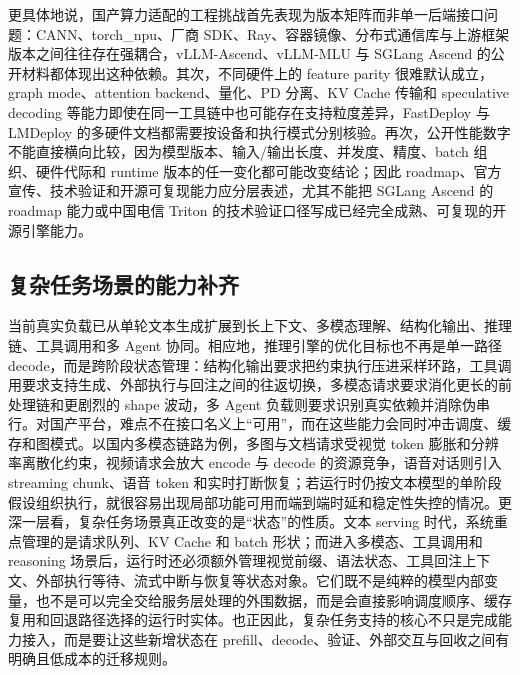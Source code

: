 更具体地说，国产算力适配的工程挑战首先表现为版本矩阵而非单一后端接口问题：CANN、torch\_npu、厂商 SDK、Ray、容器镜像、分布式通信库与上游框架版本之间往往存在强耦合，vLLM-Ascend、vLLM-MLU 与 SGLang Ascend 的公开材料都体现出这种依赖\citep{vllmascend,vllmmlu,sglang_ascend_npu}。其次，不同硬件上的 feature parity 很难默认成立，graph mode、attention backend、量化、PD 分离、KV Cache 传输和 speculative decoding 等能力即使在同一工具链中也可能存在支持粒度差异，FastDeploy 与 LMDeploy 的多硬件文档都需要按设备和执行模式分别核验\citep{fastdeploy_docs,lmdeploy_supported_models}。再次，公开性能数字不能直接横向比较，因为模型版本、输入/输出长度、并发度、精度、batch 组织、硬件代际和 runtime 版本的任一变化都可能改变结论；因此 roadmap、官方宣传、技术验证和开源可复现能力应分层表述，尤其不能把 SGLang Ascend 的 roadmap 能力或中国电信 Triton 的技术验证口径写成已经完全成熟、可复现的开源引擎能力\citep{sglang_ascend_roadmap_2026,chinatelecom_triton_validation_2025,chinatelecom_wbba_2026}。

\subsection{复杂任务场景的能力补齐}

当前真实负载已从单轮文本生成扩展到长上下文、多模态理解、结构化输出、推理链、工具调用和多 Agent 协同\citep{dong2024xgrammar,liu2025elasticmm,xie2025aimetropolis}。相应地，推理引擎的优化目标也不再是单一路径 decode，而是跨阶段状态管理：结构化输出要求把约束执行压进采样环路，工具调用要求支持生成、外部执行与回注之间的往返切换，多模态请求要求消化更长的前处理链和更剧烈的 shape 波动，多 Agent 负载则要求识别真实依赖并消除伪串行。对国产平台，难点不在接口名义上“可用”，而在这些能力会同时冲击调度、缓存和图模式。以国内多模态链路为例，多图与文档请求受视觉 token 膨胀和分辨率离散化约束，视频请求会放大 encode 与 decode 的资源竞争，语音对话则引入 streaming chunk、语音 token 和实时打断恢复；若运行时仍按文本模型的单阶段假设组织执行，就很容易出现局部功能可用而端到端时延和稳定性失控的情况\citep{wang2024qwen2vl,chen2024internvl2,wang2024cogvlm2,chu2024qwen2audio,zeng2024glm4voice,cui2026minicpmo45}。更深一层看，复杂任务场景真正改变的是“状态”的性质。文本 serving 时代，系统重点管理的是请求队列、KV Cache 和 batch 形状；而进入多模态、工具调用和 reasoning 场景后，运行时还必须额外管理视觉前缀、语法状态、工具回注上下文、外部执行等待、流式中断与恢复等状态对象。它们既不是纯粹的模型内部变量，也不是可以完全交给服务层处理的外围数据，而是会直接影响调度顺序、缓存复用和回退路径选择的运行时实体。也正因此，复杂任务支持的核心不只是完成能力接入，而是要让这些新增状态在 prefill、decode、验证、外部交互与回收之间有明确且低成本的迁移规则。

